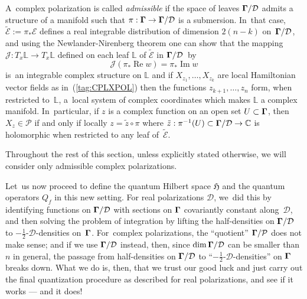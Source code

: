 \documentclass[11pt]{amsart}
\numberwithin{equation}{section}
\theoremstyle{remark}
\let\Bbb\mathbb \let\Cal\mathcal \let\frak\mathfrak
\newcommand\Omg{{\bigam}}   %
\newcommand\PP{{\Cal P}}
\newcommand\DD{{\Cal D}}
\newcommand\MD{{\Omg/\DD}}
\newcommand\mhD{$-\tfrac12$-$\DD$}
\newcommand\EE{{\Cal E}}
\newcommand\HH{\mathfrak H}
\newcommand{\CC}{\C}
\newcommand{\bigam}{\mbox{\boldmath $\Gamma$}}
\newcommand{\C}{\mathbb C}
\begin{document}
A~complex polarization is called {\sl admissible\/} if the space of leaves
$\MD$ admits a structure of a manifold such that $\pi:\Omg\to\MD$ is a
submersion. In~that case, $\tilde\EE:=\pi_*\EE$ defines a real integrable
distribution of dimension $2(n-k)$ on~$\MD$, and using the Newlander-Nirenberg
theorem one can show that the mapping $\Cal J: T_x\Bbb L\to T_x\Bbb L$ defined
on each leaf $\Bbb L$ of $\tilde\EE$ in $\MD$~by
$$ \Cal J(\pi_*\operatorname{Re}w) = \pi_*\operatorname{Im}w  $$
is~an integrable complex structure on $\Bbb L$ and if $X_{z_1},\dots,X_{z_k}$
are local Hamiltonian vector fields as in~(\ref{tag:CPLXPOL}) then the
functions $z_{k+1},\dots,z_n$ form, when restricted to~$\Bbb L$, a~local system
of complex coordinates which makes $\Bbb L$ a complex manifold. In~particular,
if $z$ is a complex function on an open set $U\subset \Omg$, then $X_z\in\PP$
if and only if locally $z=\tilde z\circ\pi$ where $\tilde z:\pi^{-1}(U)\subset
\MD\to\CC$ is holomorphic when restricted to any leaf of~$\tilde\EE$.

Throughout the rest of this section, unless explicitly stated otherwise, we
will consider only admissible complex polarizations.

Let~us now proceed to define the quantum Hilbert space $\HH$ and the quantum
operators $Q_f$ in this new setting. For real polarizations $\DD$, we~did this
by identifying functions on $\MD$ with sections on $\Omg$ covariantly constant
along~$\DD$, and then solving the problem of integration by lifting the
half-densities on $\MD$ to \mhD-densities on~$\Omg$. For~complex polarizations,
the ``quotient'' $\Omg/\PP$ does not make sense; and if we use $\MD$ instead,
then, since $\dim\MD$ can be smaller than $n$ in general, the passage from
half-densities on $\MD$ to ``\mhD-densities'' on $\Omg$ breaks down.
What we do is, then, that we trust our good luck and
just carry out the final quantization procedure as described for real
polarizations, and see if it works --- and it does!
\end{document}
